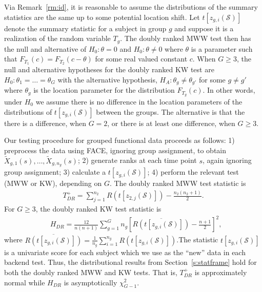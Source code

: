 \documentclass[12pt]{article}
\theoremstyle{plain}
\theoremstyle{remark}
\begin{document}
	 Via Remark~\ref{rm:id}, it is reasonable to assume the distributions of the summary statistics are the same up to some potential location shift. Let $t[z_{g,i}(\mathcal{S})]$ denote the summary statistic for a subject in group $g$ and suppose it is a realization of the random variable $T_g$. The doubly ranked MWW test then has the null and alternative of $H_0: \theta = 0$ and $H_0: \theta \neq 0$ where $\theta$ is a parameter such that $F_{T_1}(c) = F_{T_2}(c-\theta)$ for some real valued constant $c$. When $G \geq 3$, the null and alternative hypotheses for the doubly ranked KW test are $H_0 : \theta_1 = \ldots = \theta_G$ with the alternative hypothesis, $H_A : \theta_g \neq \theta_{g'}$ for some $g \neq g'$ where $\theta_g$ is the location parameter for the distribution $F_{T_g}(c)$. In other words, under $H_0$ we assume there is no difference in the location parameters of the distributions of $t[z_{g,i}(\mathcal{S})]$ between the groups. The alternative is that the there is a difference, when $G = 2$, or there is at least one difference, when $G \geq 3$. 
	
	Our testing procedure for grouped functional data proceeds as follows: 1) preprocess the data using FACE, ignoring group assignment, to obtain $\tilde{X}_{g,1}(s), \ldots, \tilde{X}_{g, n_g}(s)$; 2) generate ranks at each time point $s$, again ignoring group assignment; 3) calculate a $t[z_{g,i}(\mathcal{S})]$; 4) perform the relevant test (MWW or KW), depending on $G$. The doubly ranked MWW test statistic is
	\begin{align*}
		T_{DR}^+ = \sum_{j=1}^{n_2} R\left( t\left[z_{2,j}(\mathcal{S})\right] \right) - \frac{n_2(n_2 + 1)}{2}.
	\end{align*}
	For $G \geq 3$, the doubly ranked KW test statistic is
	\begin{align*}
		&H_{DR} = \frac{12}{n(n+1)} \sum_{g = 1}^G n_{g} \left[ \overline{R\left( t\left[z_{g,i}(\mathcal{S})\right] \right)} - \frac{n+1}{2}\right]^2,
	\end{align*}
	where $\overline{R\left( t\left[z_{g,i}(\mathcal{S})\right] \right)} = \frac{1}{n_g} \sum_{i=1}^{n_g} R\left( t\left[z_{g,i}(\mathcal{S})\right] \right)$.The statistic $t\left[z_{g,i}(\mathcal{S})\right]$ is a univariate score for each subject which we use as the ``new'' data in each backend test. Thus, the distributional results from Section~\ref{s:statframe} hold for both the doubly ranked MWW and KW tests. That is, $T_{DR}^+$ is approximately normal while $H_{DR}$ is asymptotically $\chi_{G-1}^2$. 
	
\end{document}
